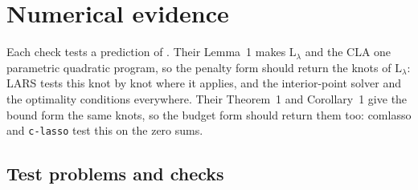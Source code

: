 \documentclass[11pt]{article}
\theoremstyle{remark}
\begin{document}
\section{Numerical evidence}
\label{sec:evidence}

Each check tests a prediction of \cite{perspective}. Their Lemma~1 makes
$\mathrm{L}_\lambda$ and the CLA one parametric quadratic program, so the penalty form
should return the knots of $\mathrm{L}_\lambda$: LARS tests this knot by knot where it
applies, and the interior-point solver and the optimality conditions everywhere.
Their Theorem~1 and Corollary~1 give the bound form the same knots, so the budget form
should return them too: comlasso and \texttt{c-lasso} test this on the zero sums.

\subsection{Test problems and checks}
\label{sec:checks}
\end{document}

